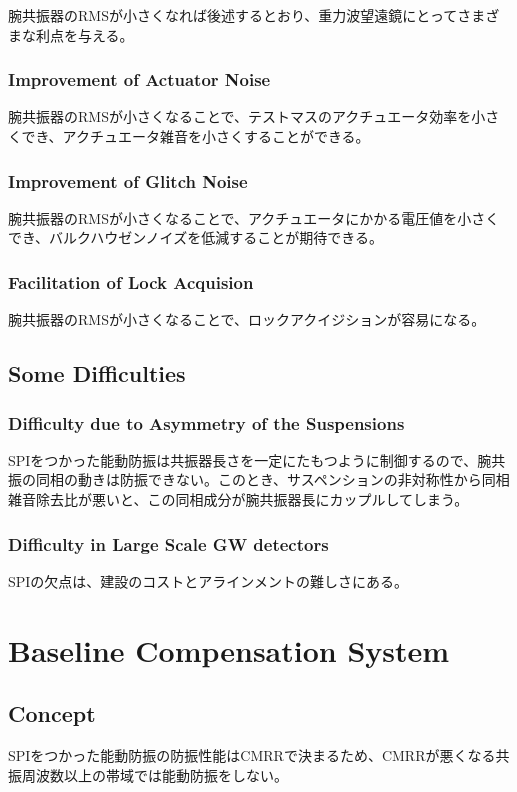 腕共振器のRMSが小さくなれば後述するとおり、重力波望遠鏡にとってさまざまな利点を与える。

\subsubsection{Improvement of Actuator Noise}
腕共振器のRMSが小さくなることで、テストマスのアクチュエータ効率を小さくでき、アクチュエータ雑音を小さくすることができる。

\subsubsection{Improvement of Glitch Noise}
腕共振器のRMSが小さくなることで、アクチュエータにかかる電圧値を小さくでき、バルクハウゼンノイズを低減することが期待できる。

\cite{manson1972frequency}
\cite{aasi2015characterization}
\cite{cote1991self}

\subsubsection{Facilitation of Lock Acquision}
腕共振器のRMSが小さくなることで、ロックアクイジションが容易になる。

\subsection{Some Difficulties}
\subsubsection{Difficulty due to Asymmetry of the Suspensions}
SPIをつかった能動防振は共振器長さを一定にたもつように制御するので、腕共振の同相の動きは防振できない。このとき、サスペンションの非対称性から同相雑音除去比が悪いと、この同相成分が腕共振器長にカップルしてしまう。

\subsubsection{Difficulty in Large Scale GW detectors}
SPIの欠点は、建設のコストとアラインメントの難しさにある。





%
\section{Baseline Compensation System}\label{sec:52}
\subsection{Concept}
SPIをつかった能動防振の防振性能はCMRRで決まるため、CMRRが悪くなる共振周波数以上の帯域では能動防振をしない。


